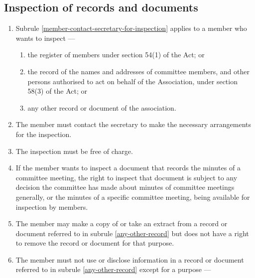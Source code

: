 \documentclass[../constitution.tex]{subfiles}
\begin{document}
\hypertarget{inspection-of-records-and-documents}{%
\subsection{Inspection of records and documents}\label{inspection-of-records-and-documents}}

\begin{enumerate}

\item Subrule \ref{member-contact-secretary-for-inspection} applies to a member who wants to inspect ---

  \begin{enumerate}
  
  \item the register of members under section 54(1) of the Act; or
  \item the record of the names and addresses of committee members, and other persons authorised to act on behalf of the Association, under section 58(3) of the Act; or
  \item any other record or document of the association. \label{any-other-record}
  \end{enumerate}
\item The member must contact the secretary to make the necessary arrangements for the inspection. \label{member-contact-secretary-for-inspection}
\item The inspection must be free of charge.
\item If the member wants to inspect a document that records the minutes of a committee meeting, the right to inspect that document is subject to any decision the committee has made about minutes of committee meetings generally, or the minutes of a specific committee meeting, being available for inspection by members.
\item The member may make a copy of or take an extract from a record or document referred to in subrule \ref{any-other-record} but does not have a right to remove the record or document for that purpose.


\item The member must not use or disclose information in a record or document referred to in subrule \ref{any-other-record} except for a purpose ---


\end{enumerate}
\end{document}
